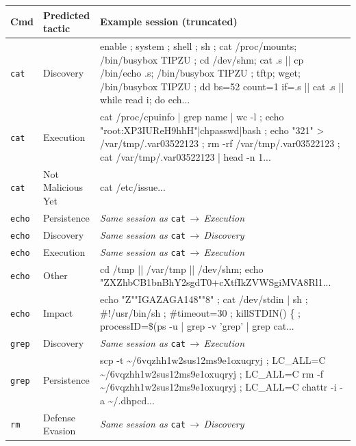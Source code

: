 \begin{table}[H]
    \centering
    \scriptsize
    \renewcommand{\arraystretch}{1.12}
    \begin{tabular}{@{}llp{9.5cm}@{}}
        \toprule
        \textbf{Cmd} & \textbf{Predicted tactic} & \textbf{Example session (truncated)} \\
        \midrule
        \texttt{cat} & Discovery & {\ttfamily enable ; system ; shell ; sh ; cat /proc/mounts; /bin/busybox TIPZU ; cd /dev/shm; cat .s || cp /bin/echo .s; /bin/busybox TIPZU ; tftp; wget; /bin/busybox TIPZU ; dd bs=52 count=1 if=.s || cat .s || while read i; do ech...} \\
        \texttt{cat} & Execution & {\ttfamily cat /proc/cpuinfo | grep name | wc -l ; echo "root:XP3IUReH9hhH"|chpasswd|bash ; echo "321" > /var/tmp/.var03522123 ; rm -rf /var/tmp/.var03522123 ; cat /var/tmp/.var03522123 | head -n 1...} \\
        \texttt{cat} & Not Malicious Yet & {\ttfamily cat /etc/issue...} \\
        \addlinespace
        \texttt{echo} & Persistence & \textit{Same session as} \texttt{cat}$\,\to\,$\textit{Execution} \\
        \texttt{echo} & Discovery & \textit{Same session as} \texttt{cat}$\,\to\,$\textit{Discovery} \\
        \texttt{echo} & Execution & \textit{Same session as} \texttt{cat}$\,\to\,$\textit{Execution} \\
        \texttt{echo} & Other & {\ttfamily cd /tmp || /var/tmp || /dev/shm; echo "ZXZhbCB1bnBhY2sgdT0+cXtfIkZVWSgiMVA8Rl1...} \\ %
        \texttt{echo} & Impact & {\ttfamily echo "Z""IGAZAGA148""8" ; cat /dev/stdin | sh ; \#!/usr/bin/sh ; \#timeout=30 ; killSTDIN() \{ ; processID=\$(ps -u | grep -v 'grep' | grep cat...} \\
        \addlinespace
        \texttt{grep} & Discovery & \textit{Same session as} \texttt{cat}$\,\to\,$\textit{Execution} \\
        \texttt{grep} & Persistence & {\ttfamily scp -t \textasciitilde{}/6vqzhh1w2sus12ms9e1oxuqryj ; LC\_ALL=C \textasciitilde{}/6vqzhh1w2sus12ms9e1oxuqryj ; LC\_ALL=C rm -f \textasciitilde{}/6vqzhh1w2sus12ms9e1oxuqryj ; LC\_ALL=C chattr -i -a \textasciitilde{}/.dhpcd...} \\
        \addlinespace
        \texttt{rm} & Defense Evasion & \textit{Same session as} \texttt{cat}$\,\to\,$\textit{Discovery} \\

\end{tabular}
\end{table}
